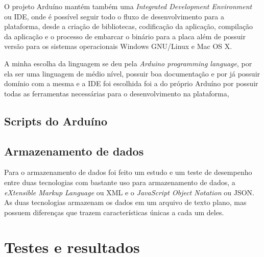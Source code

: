 \documentclass[final,12pt, times, 5p, twocolumn]{elsarticle}
\begin{document}
O projeto Arduíno mantém também uma \textit{Integrated Development Environment} ou IDE, onde é possível seguir todo o fluxo de desenvolvimento para a plataforma, desde a criação de bibliotecas, codificação da aplicação, compilação da aplicação e o processo de embarcar o binário para a placa além de possuir versão para os sistemas  operacionais Windows GNU/Linux e Mac OS X.

A minha escolha da linguagem se deu pela \textit{Arduino programming language}, por ela ser uma linguagem de médio nível, possuir boa documentação e por já possuir domínio com a mesma e a IDE foi escolhida foi a do próprio Arduíno por possuir todas as ferramentas necessárias para o desenvolvimento na plataforma,

\subsection{Scripts do Arduíno}


\subsection{Armazenamento de dados}
Para o armazenamento de dados foi feito um estudo e um teste de desempenho entre duas tecnologias com bastante uso para armazenamento de dados, a \textit{eXtensible Markup Language} ou XML e o \textit{JavaScript Object Notation} ou JSON. As duas tecnologias armazenam os dados em um arquivo de texto plano, mas possuem diferenças que trazem características únicas a cada um deles.

\section{Testes e resultados}

\label{}




\end{document}
